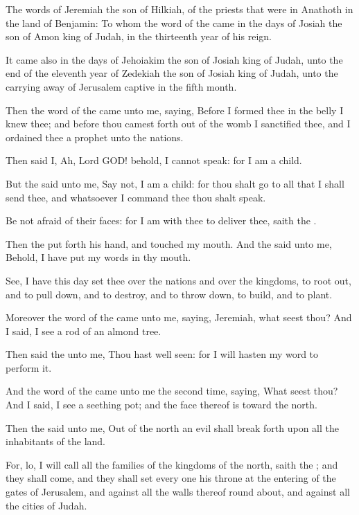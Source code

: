 \Chapter
\Verse The words of Jeremiah the son of Hilkiah, of the priests that were in Anathoth in the land of Benjamin: \Verse To whom the word of the \LORD came in the days of Josiah the son of Amon king of Judah, in the thirteenth year of his reign.

\Verse It came also in the days of Jehoiakim the son of Josiah king of Judah, unto the end of the eleventh year of Zedekiah the son of Josiah king of Judah, unto the carrying away of Jerusalem captive in the fifth month.

\Verse Then the word of the \LORD came unto me, saying, \Verse Before I formed thee in the belly I knew thee; and before thou camest forth out of the womb I sanctified thee, and I ordained thee a prophet unto the nations.

\Verse Then said I, Ah, Lord GOD! behold, I cannot speak: for I am a child.

\Verse But the \LORD said unto me, Say not, I am a child: for thou shalt go to all that I shall send thee, and whatsoever I command thee thou shalt speak.

\Verse Be not afraid of their faces: for I am with thee to deliver thee, saith the \LORD.

\Verse Then the \LORD put forth his hand, and touched my mouth. And the \LORD said unto me, Behold, I have put my words in thy mouth.

\Verse See, I have this day set thee over the nations and over the kingdoms, to root out, and to pull down, and to destroy, and to throw down, to build, and to plant.

\Verse Moreover the word of the \LORD came unto me, saying, Jeremiah, what seest thou? And I said, I see a rod of an almond tree.

\Verse Then said the \LORD unto me, Thou hast well seen: for I will hasten my word to perform it.

\Verse And the word of the \LORD came unto me the second time, saying, What seest thou? And I said, I see a seething pot; and the face thereof is toward the north.

\Verse Then the \LORD said unto me, Out of the north an evil shall break forth upon all the inhabitants of the land.

\Verse For, lo, I will call all the families of the kingdoms of the north, saith the \LORD; and they shall come, and they shall set every one his throne at the entering of the gates of Jerusalem, and against all the walls thereof round about, and against all the cities of Judah.

